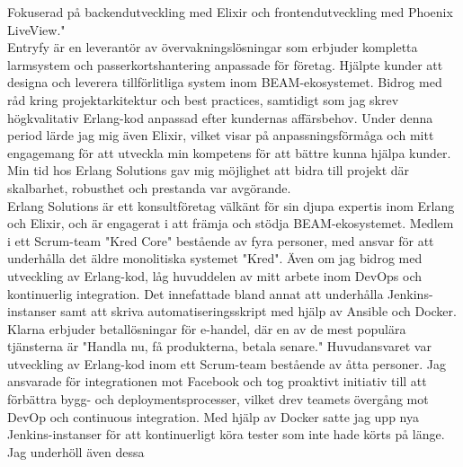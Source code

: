 \documentclass[purpleprocv]{procv}
\begin{document}
\begin{procv-twocolumns}
{          {Fokuserad på backendutveckling med Elixir och frontendutveckling med Phoenix LiveView."
          \\[3pt]
          Entryfy är en leverantör av övervakningslösningar som erbjuder kompletta larmsystem och passerkortshantering anpassade för företag.}
          {Hjälpte kunder att designa och 
          leverera tillförlitliga system inom BEAM-ekosystemet. Bidrog med råd kring 
          projektarkitektur och best practices, samtidigt som jag skrev högkvalitativ 
          Erlang-kod anpassad efter kundernas affärsbehov. Under denna period lärde 
          jag mig även Elixir, vilket visar på anpassningsförmåga och mitt engagemang 
          för att utveckla min kompetens för att bättre kunna hjälpa kunder. Min tid 
          hos Erlang Solutions gav mig möjlighet att bidra till projekt där skalbarhet, 
          robusthet och prestanda var avgörande.
          \\[3pt]
          Erlang Solutions är ett konsultföretag välkänt för sin djupa expertis inom Erlang 
          och Elixir, och är engagerat i att främja och stödja BEAM-ekosystemet.}
          {Medlem i ett Scrum-team "Kred Core" bestående av fyra personer, med ansvar för att underhålla det äldre monolitiska 
          systemet "Kred". Även om jag bidrog med 
          utveckling av Erlang-kod, låg huvuddelen av mitt arbete inom DevOps och kontinuerlig 
          integration. Det innefattade bland annat att underhålla Jenkins-instanser samt 
          att skriva automatiseringsskript med hjälp av Ansible och Docker.
          \\[3pt]
          Klarna erbjuder betallösningar för e-handel, där en av de mest populära tjänsterna 
          är "Handla nu, få produkterna, betala senare."}
          {Huvudansvaret var utveckling av Erlang-kod inom ett Scrum-team  bestående av åtta personer. Jag ansvarade för 
          integrationen mot Facebook och tog proaktivt initiativ till att förbättra bygg- och 
          deploymentsprocesser, vilket drev teamets övergång mot DevOp och continuous 
          integration. Med hjälp av Docker satte jag upp nya Jenkins-instanser för att 
          kontinuerligt köra tester som inte hade körts på länge. Jag underhöll även dessa 
}}
\end{procv-twocolumns}
\end{document}
